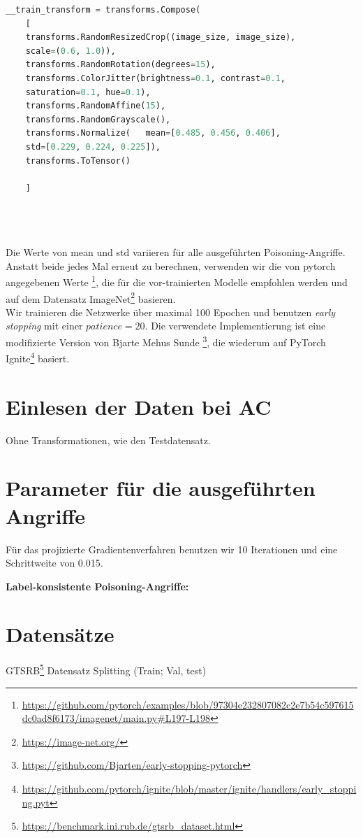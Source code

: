 \documentclass[11pt,a4paper]{article}
\numberwithin{equation}{section}
\begin{document}
	\begin{lstlisting}[language=Python, caption=Augemntierung beim Einlesen der Daten]
	__train_transform = transforms.Compose(
	[
	transforms.RandomResizedCrop((image_size, image_size), 
	scale=(0.6, 1.0)),
	transforms.RandomRotation(degrees=15),
	transforms.ColorJitter(brightness=0.1, contrast=0.1, 
	saturation=0.1, hue=0.1),
	transforms.RandomAffine(15),
	transforms.RandomGrayscale(),
	transforms.Normalize(	mean=[0.485, 0.456, 0.406], 
	std=[0.229, 0.224, 0.225]),
	transforms.ToTensor()
	
	]
	
	
	
	\end{lstlisting}
	Die Werte von mean und std variieren für alle ausgeführten Poisoning-Angriffe. Anstatt beide jedes Mal erneut zu berechnen, verwenden wir die von pytorch angegebenen Werte \footnote{\url{https://github.com/pytorch/examples/blob/97304e232807082c2e7b54c597615dc0ad8f6173/imagenet/main.py\#L197-L198}}, die für die vor-trainierten Modelle empfohlen werden und auf dem Datensatz ImageNet\footnote{\url{https://image-net.org/}} basieren.\\ 
	Wir trainieren die Netzwerke über maximal 100 Epochen und benutzen \textit{early stopping} mit einer $patience=20$. Die verwendete Implementierung ist eine modifizierte Version von Bjarte Mehus Sunde \footnote{\url{https://github.com/Bjarten/early-stopping-pytorch}}, die wiederum auf PyTorch Ignite\footnote{\url{https://github.com/pytorch/ignite/blob/master/ignite/handlers/early\_stopping.pyt}} basiert.\\
	
	\section{Einlesen der Daten bei AC}
	Ohne Transformationen, wie den Testdatensatz.
	
	
	\section{Parameter für die ausgeführten Angriffe}\label{param_attacks}
	Für das projizierte Gradientenverfahren benutzen wir 10 Iterationen und eine Schrittweite von 0.015.
	
	\textbf{Label-konsistente Poisoning-Angriffe:}
	\section{Datensätze}
	GTSRB\footnote{\url{https://benchmark.ini.rub.de/gtsrb_dataset.html}}
	Datensatz Splitting (Train; Val, test)
	
\end{document}

